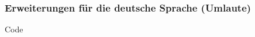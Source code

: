 \begin{frame}
    \frametitle{Erweiterungen für die deutsche Sprache (Umlaute)}
    \begin{block}{Code}
        
    \end{block}
\end{frame}
